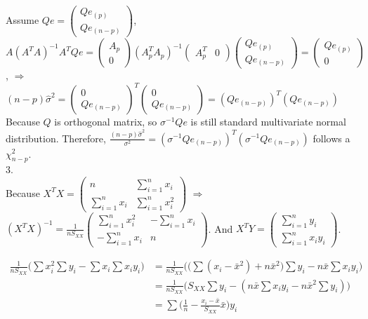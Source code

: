 \documentclass[fleqn]{article}
\begin{document}
Assume $Qe = \left(\begin{matrix}
Qe_{(p)}\\
Qe_{(n-p)}
\end{matrix}\right)$, $A(A^TA)^{-1}A^TQe = \left(\begin{matrix}
A_p\\
0
\end{matrix}\right) (A_p^T A_p)^{-1} \left(\begin{matrix}
A_p^T & 0
\end{matrix}\right) \left(\begin{matrix}
Qe_{(p)}\\
Qe_{(n-p)}
\end{matrix}\right)= \left(\begin{matrix}
Qe_{(p)}\\
0
\end{matrix}\right)$, $\Rightarrow$ $(n-p)\hat{\sigma}^2 = \left(\begin{matrix}
0\\
Qe_{(n-p)}
\end{matrix}\right)^T \left(\begin{matrix}
0\\
Qe_{(n-p)}
\end{matrix}\right) = (Qe_{(n-p)})^T (Qe_{(n-p)})$\\

Because $Q$ is orthogonal matrix, so $\sigma^{-1}Qe$ is still standard multivariate normal distribution. Therefore, $\frac{(n-p)\hat{\sigma}^2}{\sigma^2} = (\sigma^{-1}Qe_{(n-p)})^T (\sigma^{-1}Qe_{(n-p)})$ follows a $\chi_{n-p}^2$.\\


3.\\

Because $X^TX = \left(\begin{matrix}
n & \sum_{i=1}^{n}x_i \\ 
\sum_{i=1}^{n}x_i & \sum_{i=1}^{n}x_i^2 
\end{matrix}\right)$ $\Rightarrow$ $(X^TX)^{-1} = \frac{1}{nS_{XX}}\left(\begin{matrix}
\sum_{i=1}^{n}x_i^2 & -\sum_{i=1}^{n}x_i \\ 
-\sum_{i=1}^{n}x_i & n
\end{matrix}\right)$. And $X^TY = \left(\begin{matrix}
\sum_{i=1}^{n}y_i\\ 
\sum_{i=1}^{n}x_i y_i
\end{matrix}\right)$. 


\begin{equation*}
\begin{split}
\frac{1}{nS_{XX}}\Big( \sum x_i^2 \sum y_i - \sum x_i \sum x_i y_i \Big) &= \frac{1}{nS_{XX}}\Big( \big(\sum(x_i - \bar{x}^2) + n\bar{x}^2\big) \sum y_i -n\bar{x} \sum x_i y_i \Big)\\
&= \frac{1}{nS_{XX}}\Big( S_{XX} \sum y_i - (n\bar{x} \sum x_i y_i - n\bar{x}^2 \sum y_i)\Big)\\
&= \sum \Big( \frac{1}{n} - \frac{x_i - \bar{x}}{S_{XX}} \bar{x}\Big) y_i
\end{split}
\end{equation*}
\end{document}
